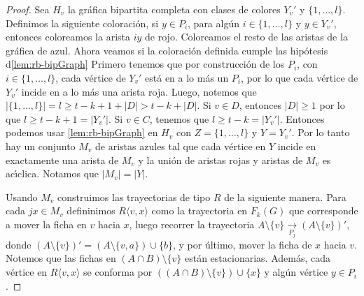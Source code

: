 \begin{proof}
    Sea $H_v$ la gr\'afica bipartita completa con clases de colores $Y_v '$ y
    $\{1,\dots, l\}$. Definimos la siguiente coloraci\'on, si $y \in P_i$, para
    alg\'un $i \in \{1, \dots, l\}$ y $y \in Y_v '$, entonces coloreamos la
    arista $iy$ de rojo. Coloreamos el resto de las aristas de la gr\'afica de
    azul. Ahora veamos si la coloraci\'on definida cumple las hip\'otesis
    d\cref{lem:rb-bipGraph} Primero tenemos que por construcci\'on de los $P_i$,
    con $i \in \{1, \dots, l\}$, cada v\'ertice de $Y_v '$ est\'a en a lo m\'as
    un $P_i$, por lo que cada v\'ertice de $Y_v '$ incide en a lo m\'as una
    arista roja. Luego, notemos que $|\{1, \dots, l\}| = l  \geq t-k+ 1+ |D| >
    t-k + |D|$. Si $v \in D$, entonces $|D| \geq 1$ por lo que $l \geq t- k+1 =
    |Y_v '|$. Si $v \in C$, tenemos que $l \geq t-k = |Y_v '|$. Entonces podemos
    usar \cref{lem:rb-bipGraph} en $H_v$ con $Z= \{1, \dots, l\}$ y $Y = Y_v '$.
    Por lo tanto hay un conjunto $M_v$ de aristas azules tal que cada v\'ertice
    en $Y$ incide en exactamente una arista de $M_v$ y la uni\'on de aristas
    rojas y aristas de $M_v$ es ac\'\i{}clica. Notamos que $|M_v|=|Y|$.

    Usando $M_v$ construimos las trayectorias de tipo $R$ de la siguiente
    manera. Para cada $jx \in M_v$ defininimos $R\langle v, x \rangle$ como la
    trayectoria en $F_k(G)$ que corresponde a mover la ficha en $v$ hacia $x$,
    luego recorrer la trayectoria $A\setminus \{v\} \xrightarrow[P_j]{}
    (A\setminus \{v\})'$, donde $(A\setminus \{v\})' = (A\setminus \{v,a\})\cup
    \{b\}$, y por \'ultimo, mover la ficha de $x$ hacia $v$. Notemos que las
    fichas en $(A\cap B)\setminus \{v\}$ est\'an estacionarias. Adem\'as, cada
    v\'ertice en $R\langle v,x \rangle$ se conforma por $((A\cap B)\setminus
    \{v\}) \cup \{x\}$ y alg\'un v\'ertice $y \in P_i$.


\end{proof}
